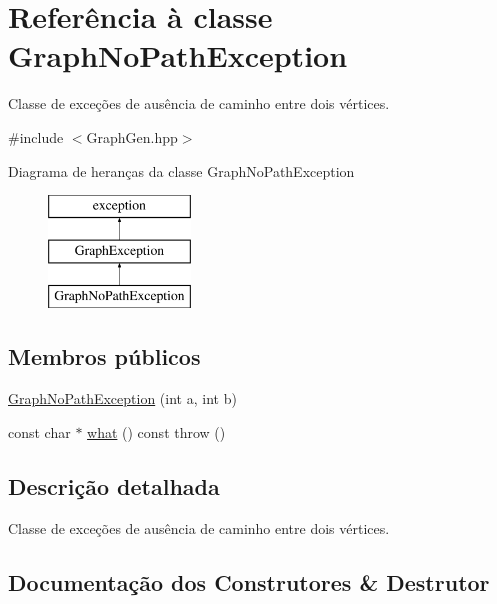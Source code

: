 \hypertarget{classGraphNoPathException}{}\section{Referência à classe Graph\+No\+Path\+Exception}
\label{classGraphNoPathException}


Classe de exceções de ausência de caminho entre dois vértices.  




{\ttfamily \#include $<$Graph\+Gen.\+hpp$>$}

Diagrama de heranças da classe Graph\+No\+Path\+Exception\begin{figure}[H]
\begin{center}
\leavevmode
\includegraphics[height=3.000000cm]{classGraphNoPathException}
\end{center}
\end{figure}
\subsection*{Membros públicos}
\begin{DoxyCompactItemize}
\item 
\hyperlink{classGraphNoPathException_a1d9dd40f194e7705b8009cd2a4ed7f79}{Graph\+No\+Path\+Exception} (int a, int b)
\item 
const char $\ast$ \hyperlink{classGraphNoPathException_a33d7ba709a76ad03175a929e8313221c}{what} () const  throw ()
\end{DoxyCompactItemize}


\subsection{Descrição detalhada}
Classe de exceções de ausência de caminho entre dois vértices. 

\subsection{Documentação dos Construtores \& Destrutor}
\mbox{\label{classGraphNoPathException_a1d9dd40f194e7705b8009cd2a4ed7f79}} 
